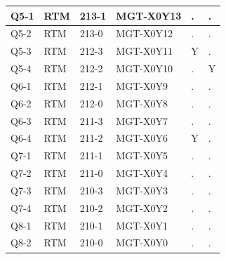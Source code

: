 \documentclass[letterpaper]{article}
\begin{document}
\begin{table}[htp]
\begin{tabular}{|l|l|l|l|l|l|}
Q5-1 & RTM & 213-1 & MGT-X0Y13 & . & . \\ \hline
Q5-2 & RTM & 213-0 & MGT-X0Y12 & . & . \\ \hline
Q5-3 & RTM & 212-3 & MGT-X0Y11 & Y & . \\ \hline
Q5-4 & RTM & 212-2 & MGT-X0Y10 & . & Y \\ \hline
Q6-1 & RTM & 212-1 & MGT-X0Y9 & . & .  \\ \hline
Q6-2 & RTM & 212-0 & MGT-X0Y8 & . & .  \\ \hline
Q6-3 & RTM & 211-3 & MGT-X0Y7 & . & .  \\ \hline
Q6-4 & RTM & 211-2 & MGT-X0Y6 & Y & .  \\ \hline
Q7-1 & RTM & 211-1 & MGT-X0Y5 & . & .  \\ \hline
Q7-2 & RTM & 211-0 & MGT-X0Y4 & . & .  \\ \hline
Q7-3 & RTM & 210-3 & MGT-X0Y3 & . & .  \\ \hline
Q7-4 & RTM & 210-2 & MGT-X0Y2 & . & .  \\ \hline
Q8-1 & RTM & 210-1 & MGT-X0Y1 & . & .  \\ \hline
Q8-2 & RTM & 210-0 & MGT-X0Y0 & . & .  \\ \hline
\end{tabular}
\end{table}

\newpage
\end{document}
